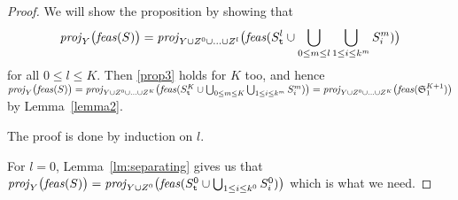 \propto*
\begin{proof}
We will show the proposition by showing that 
\begin{equation}\label{prop3}
\mathit{proj}_Y\big(\mathit{feas}(S)\big) = \mathit{proj}_{Y\cup Z^0\cup\ldots\cup Z^l}\big(\mathit{feas}(S^l_\texttt{t}\cup\bigcup_{0\leq m\leq l}\bigcup_{1\leq i\leq k^m} S^m_i)\big)
\end{equation}
for all $0\leq l\leq K$. Then \eqref{prop3} holds for $K$ too, and hence $\mathit{proj}_Y\big(\mathit{feas}(S)\big) = \mathit{proj}_{Y\cup Z^0\cup\ldots\cup Z^K}\big(\mathit{feas}(S^K_\texttt{t}\cup\bigcup_{0\leq m\leq K}\bigcup_{1\leq i\leq k^m} S^m_i)\big) = \mathit{proj}_{Y\cup Z^0\cup \ldots \cup Z^K}\big(\mathit{feas}(\mathfrak{S}^{K+1}_1)\big)$ by Lemma~\ref{lemma2}.

The proof is done by induction on $l$.

For $l = 0$, Lemma~\ref{lm:separating} gives us that $\mathit{proj}_Y\big(\mathit{feas}(S)\big) = \mathit{proj}_{Y\cup Z^0}\big(\mathit{feas}(S^0_{\texttt{t}}\cup\bigcup_{1\leq i\leq k^0} S^0_i)\big)$ which is what we need. 


\end{proof}
